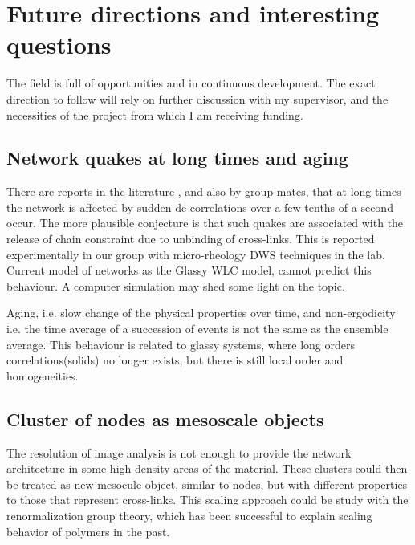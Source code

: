 \section{Future directions and interesting questions}

The field is full of opportunities and in continuous development. The exact
direction to follow will rely on further discussion with my supervisor, and the necessities
of the project from which I am receiving funding.



\subsection{Network quakes at long times and aging}
There are reports in the literature \citep{kajiya_slow_2013}, and also by group
mates, that at long times the network is affected by sudden de-correlations over
a few tenths of a second occur. The more plausible conjecture is that such quakes are associated with the release of chain constraint due to unbinding of
cross-links. This is reported experimentally in our group with micro-rheology
DWS techniques in the lab. Current model of networks as the Glassy WLC model,
cannot predict this behaviour. A computer simulation may shed some light on the
topic.

Aging, i.e. slow change of the physical properties over time, and non-ergodicity
i.e. the time average of a succession of events is not the same as the
ensemble average. This behaviour is related to glassy systems, where long
orders correlations(solids) no longer exists, but there is still local order and
homogeneities.\citep{cipelletti_slow_????}

\subsection{Cluster of nodes as mesoscale objects}
The resolution of image analysis is not enough to provide the network
architecture in some high density areas of the material. These clusters could
then be treated as new mesocule object, similar to nodes, but with different
properties to those that represent cross-links. This scaling approach could be
study with the renormalization group theory, which has been successful to explain
scaling behavior of polymers in the past.\citep{gennes_scaling_1979}

